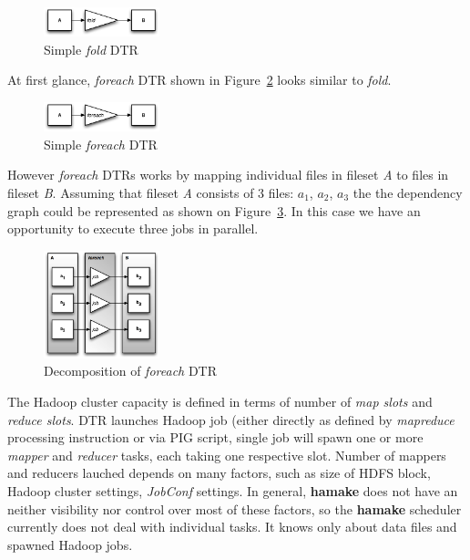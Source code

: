 \documentclass[10pt,conference,letterpaper]{IEEEtran}
\begin{document}
\begin{figure}[htp]
\centering
\includegraphics[width=0.3\textwidth]{twofold.eps}
\caption{Simple \emph{fold} DTR}
\label{fig:fold1}
\end{figure}

At first glance, \emph{foreach} DTR shown in Figure~\ref{fig:foreach1}
looks similar to \emph{fold}.

\begin{figure}[htp]
\centering
\includegraphics[width=0.3\textwidth]{twoforeach.eps}
\caption{Simple \emph{foreach} DTR}
\label{fig:foreach1}
\end{figure}

However \emph{foreach} DTRs works by mapping individual files in
fileset \textit{A} to files in fileset \textit{B}. Assuming that
fileset \textit{A} consists of 3 files: \textit{$a_1$},
\textit{$a_2$}, \textit{$a_3$} the the dependency graph could be
represented as shown on Figure~\ref{fig:foreach2}. In this case we
have an opportunity to execute three jobs in parallel.

\begin{figure}[htp]
\centering
\includegraphics[width=0.3\textwidth]{twoforeachp.eps}
\caption{Decomposition of \emph{foreach} DTR}
\label{fig:foreach2}
\end{figure}

The Hadoop cluster capacity is defined in terms of number of
\textit{map slots} and \textit{reduce slots}. DTR launches Hadoop job
(either directly as defined by \emph{mapreduce} processing instruction
or via PIG script, single job will spawn one or more \emph{mapper} and
\emph{reducer} tasks, each taking one respective slot. Number of
mappers and reducers lauched depends on many factors, such as size of
HDFS block, Hadoop cluster settings, \emph{JobConf} settings. In
general, \textbf{hamake} does not have an neither visibility nor
control over most of these factors, so the \textbf{hamake} scheduler
currently does not deal with individual tasks. It knows only about
data files and spawned Hadoop jobs.
\end{document}
